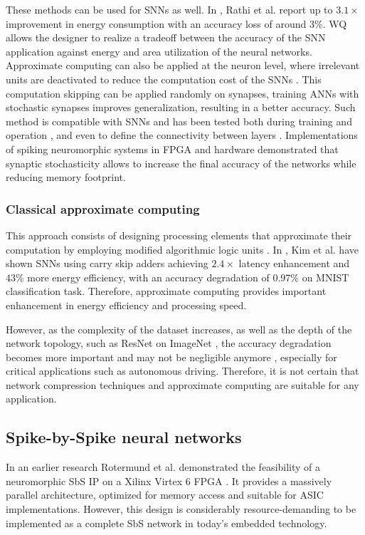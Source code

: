These methods can be used for SNNs as well. In \cite{rathi2018stdp}, Rathi et al. report up to $3.1\times$ improvement in energy consumption with an accuracy loss of around $3\%$. WQ allows the designer to realize a tradeoff between the accuracy of the SNN application against energy and area utilization of the neural networks. Approximate computing can also be applied at the neuron level, where irrelevant units are deactivated to reduce the computation cost of the SNNs \cite{sen2017approximate}. This computation skipping can be applied randomly on synapses, training ANNs with stochastic synapses improves generalization, resulting in a better accuracy\cite{srivastava2014dropout, wan2013regularization}. Such method is compatible with SNNs and has been tested both during training \cite{neftci2016stochastic, srinivasan2016magnetic} and operation \cite{buesing2011neural}, and even to define the connectivity between layers \cite{bellec2017deep, chen20184096}. Implementations of spiking neuromorphic systems in FPGA \cite{sheik2016synaptic} and hardware \cite{jerry2017ultra} demonstrated that synaptic stochasticity allows to increase the final accuracy of the networks while reducing memory footprint.

\subsubsection{Classical approximate computing}
This approach consists of designing processing elements that approximate their computation by employing modified algorithmic logic units \cite{han2013approximate}. In \cite{kim2013energy}, Kim et al. have shown SNNs using carry skip adders achieving $2.4\times$ latency enhancement and $43\%$ more energy efficiency, with an accuracy degradation of 0.97\% on MNIST classification task. Therefore, approximate computing provides important enhancement in energy efficiency and processing speed.

However, as the complexity of the dataset increases, as well as the depth of the network topology, such as ResNet \cite{he2016deep} on ImageNet \cite{russakovsky2015imagenet}, the accuracy degradation becomes more important and may not be negligible anymore \cite{rastegari2016xnor}, especially for critical applications such as autonomous driving. Therefore, it is not certain that network compression techniques and approximate computing are suitable for any application.

\subsection{Spike-by-Spike neural networks}
In an earlier research Rotermund et al. demonstrated the feasibility of a neuromorphic SbS IP on a Xilinx Virtex 6 FPGA \cite{rotermund2018massively}. It provides a massively parallel architecture, optimized for memory access and suitable for ASIC implementations. However, this design is considerably resource-demanding to be implemented as a complete SbS network in today's embedded technology.

